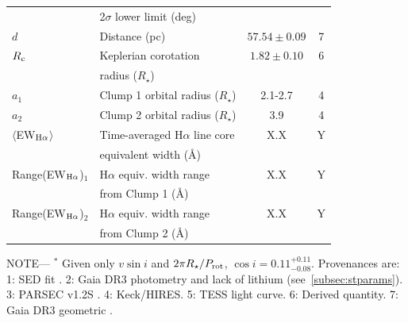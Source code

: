 \documentclass{nature3}
\begin{document}
\begin{table}
\begin{tabular}{llcc}
                                        & \hspace{3pt}  2$\sigma$ lower limit (deg)	                     &                      \\
%
$d$\dotfill                             & Distance (pc)\dotfill                                          & $57.54 \pm 0.09$   & 7 \\
%
$R_{\rm c}$\dotfill		                  & Keplerian corotation\dotfill
  & $1.82 \pm 0.10$  & 6 \\
                                        & \hspace{3pt} radius ($R_\star$)	                               &                      \\
%
$a_1$\dotfill                           & Clump 1 orbital radius ($R_\star$)\hspace{9pt}\dotfill         &  2.1-2.7         & 4 \\
$a_2$\dotfill                           & Clump 2 orbital radius ($R_\star$)\hspace{9pt}\dotfill         &  3.9             & 4 \\
%
$\langle$EW$_{\rm H\alpha}$$\rangle$    & Time-averaged H$\alpha$ line core                              &  X.X             & Y \\ 
                                        & \hspace{3pt} equivalent width (\AA)	                           &                      \\
Range(EW$_{\rm H\alpha}$)$_1$           & H$\alpha$ equiv. width range                                   &  X.X             & Y \\ 
                                        & \hspace{3pt} from Clump 1 (\AA)	                               &                      \\
Range(EW$_{\rm H\alpha}$)$_2$           & H$\alpha$ equiv. width range                                   &  X.X             & Y \\ 
                                        & \hspace{3pt} from Clump 2 (\AA)	                               &                      \\
\hline
\end{tabular}
\begin{flushleft}
\footnotesize{ \textsc{NOTE}---
$^*$ Given only $v\sin i$ and $2\pi R_\star/P_{\rm rot}$, $\cos i=0.11^{+0.11}_{-0.08}$.
Provenances are:
1: SED fit \cite{Bouma2024}.
2: Gaia DR3 photometry and lack of lithium (see~\ref{subsec:stparams}).
3: PARSEC v1.2S \cite{Chen2014}.
4: Keck/HIRES.
5: TESS light curve.
6: Derived quantity.
7: Gaia DR3 geometric \cite{GaiaDR3}.
}
\end{flushleft}
\vspace{-0.5cm}
\end{table}
\end{document}
